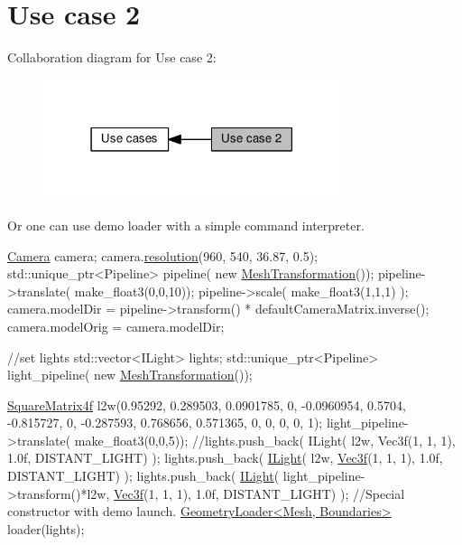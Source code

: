 \hypertarget{group__usecase2}{}\section{Use case 2}
\label{group__usecase2}
Collaboration diagram for Use case 2\+:
\nopagebreak
\begin{figure}[H]
\begin{center}
\leavevmode
\includegraphics[width=247pt]{group__usecase2}
\end{center}
\end{figure}
Or one can use demo loader with a simple command interpreter.  
\begin{DoxyCode}
    \hyperlink{struct_camera}{Camera} camera;
camera.\hyperlink{struct_camera_ab0cbf1b102afdeb285ef2be271d1701c}{resolution}(960, 540, 36.87, 0.5);
std::unique\_ptr<Pipeline> pipeline( \textcolor{keyword}{new} \hyperlink{class_mesh_transformation}{MeshTransformation}());
pipeline->translate( make\_float3(0,0,10));
pipeline->scale( make\_float3(1,1,1) );
camera.modelDir = pipeline->transform() * defaultCameraMatrix.inverse();
camera.modelOrig = camera.modelDir;

\textcolor{comment}{//set lights}
std::vector<ILight> lights;
std::unique\_ptr<Pipeline> light\_pipeline( \textcolor{keyword}{new} \hyperlink{class_mesh_transformation}{MeshTransformation}());

\hyperlink{class_square_matrix4}{SquareMatrix4f} l2w(0.95292, 0.289503, 0.0901785, 0,
     -0.0960954, 0.5704, -0.815727, 0,
     -0.287593, 0.768656, 0.571365, 0,
         0, 0, 0, 1);
light\_pipeline->translate( make\_float3(0,0,5));
\textcolor{comment}{//lights.push\_back( ILight( l2w, Vec3f(1, 1, 1), 1.0f, DISTANT\_LIGHT) );}
lights.push\_back( \hyperlink{class_i_light}{ILight}( l2w, \hyperlink{class_vec3}{Vec3f}(1, 1, 1), 1.0f, DISTANT\_LIGHT) );
lights.push\_back( \hyperlink{class_i_light}{ILight}( light\_pipeline->transform()*l2w, \hyperlink{class_vec3}{Vec3f}(1, 1, 1), 1.0f, DISTANT\_LIGHT) 
      );
\textcolor{comment}{//Special constructor with demo launch.}
\hyperlink{class_geometry_loader}{GeometryLoader<Mesh, Boundaries>} loader(lights);
\end{DoxyCode}
 